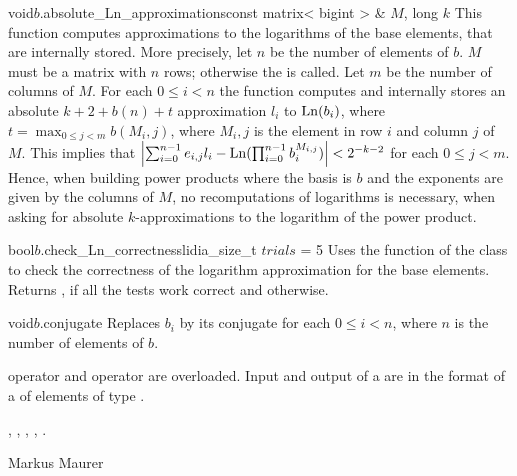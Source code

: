 \begin{fcode}{void}{$b$.absolute_Ln_approximations}{const matrix< bigint > & $M$, long $k$}
  This function computes approximations to the logarithms of the base elements, that are
  internally stored.  More precisely, let $n$ be the number of elements of $b$.  $M$ must be a
  matrix with $n$ rows; otherwise the \LEH is called.  Let $m$ be the number of columns of $M$.
  For each $0\leq i < n$ the function computes and internally stores an absolute $k + 2 + b(n) +
  t$ approximation $l_i$ to $\operatorname{Ln}(b_i)$, where $t = \max_{0\leq j < m} b(M_i,j)$, where $M_i,j$
  is the element in row $i$ and column $j$ of $M$.  This implies that $\left|\sum_{i=0}^{n-1}
    e_{i,j} l_i - \operatorname{Ln}(\prod_{i=0}^{n-1} b_i^{M_{i,j}})\right| < 2^{-k-2}$ for each $0\leq j <
  m$.  Hence, when building power products where the basis is $b$ and the exponents are given by
  the columns of $M$, no recomputations of logarithms is necessary, when asking for absolute
  $k$-approximations to the logarithm of the power product.
\end{fcode}

\begin{cfcode}{bool}{$b$.check_Ln_correctness}{lidia_size_t $\mathit{trials}$ = 5}
  Uses the function  of the class
   to check the correctness of the
  logarithm approximation for the base elements.  Returns \TRUE, if all the tests work correct
  and \FALSE otherwise.
\end{cfcode}

\begin{fcode}{void}{$b$.conjugate}{}
  Replaces $b_i$ by its conjugate for each $0 \leq i <n$, where $n$ is the number of elements of
  $b$.
\end{fcode}



\IO

 operator \code{>>} and  operator \code{<<} are overloaded.  Input
and output of a  are in the format of a
 of elements of type
.



\SEEALSO

, ,
,
,
.



\AUTHOR

Markus Maurer
